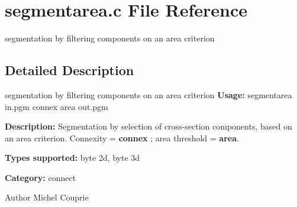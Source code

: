 \section{segmentarea.c File Reference}
\label{segmentarea_8c}


segmentation by filtering components on an area criterion  




\subsection{Detailed Description}
segmentation by filtering components on an area criterion {\bfseries Usage:} segmentarea in.pgm connex area out.pgm

{\bfseries Description:} Segmentation by selection of cross-\/section components, based on an area criterion. Connexity = {\bfseries connex} ; area threshold = {\bfseries area}.

{\bfseries Types supported:} byte 2d, byte 3d

{\bfseries Category:} connect

\begin{DoxyAuthor}{Author}
Michel Couprie 
\end{DoxyAuthor}
